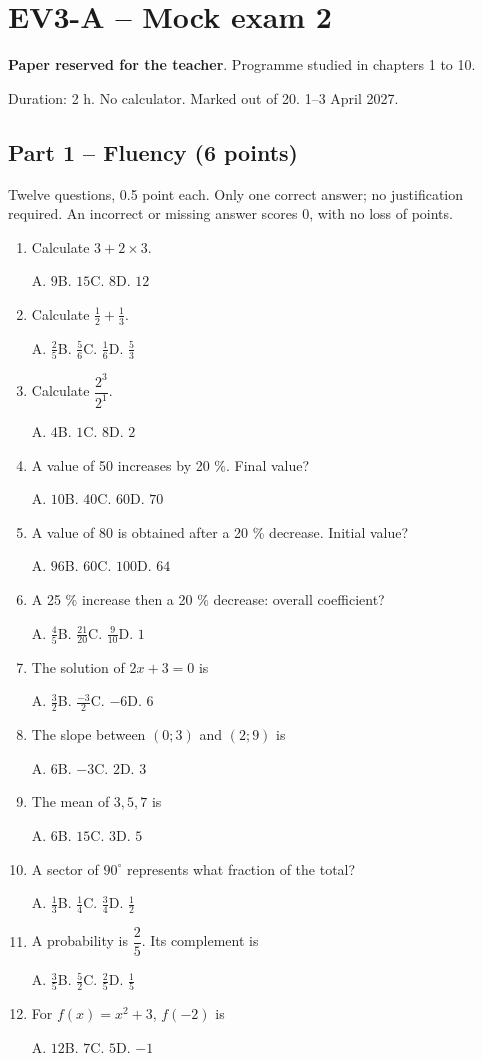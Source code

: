\clearpage\section*{EV3-A -- Mock exam 2}\label{EV3-A}
\textbf{Paper reserved for the teacher}. Programme studied in chapters 1 to 10.\par Duration: 2 h. No calculator. Marked out of 20. 1--3 April 2027.
\subsection*{Part 1 -- Fluency (6 points)}
Twelve questions, 0.5 point each. Only one correct answer; no justification required. An incorrect or missing answer scores 0, with no loss of points.
\begin{enumerate}
\item Calculate $3+2\times3$.\par A. $9$\quad B. $15$\quad C. $8$\quad D. $12$
\item Calculate $\frac12+\frac13$.\par A. $\frac{2}{5}$\quad B. $\frac{5}{6}$\quad C. $\frac{1}{6}$\quad D. $\frac{5}{3}$
\item Calculate $\dfrac{2^3}{2^{1}}$.\par A. $4$\quad B. $1$\quad C. $8$\quad D. $2$
\item A value of 50 increases by 20 \%. Final value?\par A. $10$\quad B. $40$\quad C. $60$\quad D. $70$
\item A value of 80 is obtained after a 20 \% decrease. Initial value?\par A. $96$\quad B. $60$\quad C. $100$\quad D. $64$
\item A 25 \% increase then a 20 \% decrease: overall coefficient?\par A. $\frac{4}{5}$\quad B. $\frac{21}{20}$\quad C. $\frac{9}{10}$\quad D. $1$
\item The solution of $2x+3=0$ is\par A. $\frac{3}{2}$\quad B. $\frac{-3}{2}$\quad C. $-6$\quad D. $6$
\item The slope between $(0;3)$ and $(2;9)$ is\par A. $6$\quad B. $-3$\quad C. $2$\quad D. $3$
\item The mean of $3, 5, 7$ is\par A. $6$\quad B. $15$\quad C. $3$\quad D. $5$
\item A sector of $90^\circ$ represents what fraction of the total?\par A. $\frac{1}{3}$\quad B. $\frac{1}{4}$\quad C. $\frac{3}{4}$\quad D. $\frac{1}{2}$
\item A probability is $\dfrac{2}{5}$. Its complement is\par A. $\frac{3}{5}$\quad B. $\frac{5}{2}$\quad C. $\frac{2}{5}$\quad D. $\frac{1}{5}$
\item For $f(x)=x^2+3$, $f(-2)$ is\par A. $12$\quad B. $7$\quad C. $5$\quad D. $-1$
\end{enumerate}
